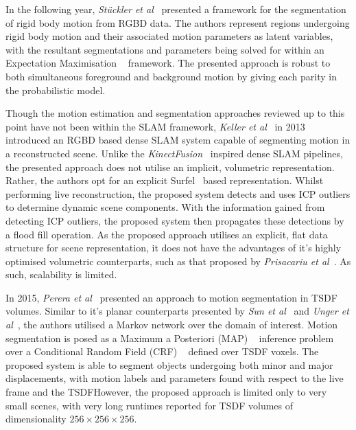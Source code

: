 In the following year, \textit{St{\"u}ckler et al}~\cite{Stueckler2013} presented a framework 
for the segmentation of rigid body motion from RGBD data. The authors represent regions undergoing 
rigid body motion and their associated motion parameters as latent variables, with the resultant 
segmentations and parameters being solved for within an Expectation Maximisation
~\cite{BishopPRML, Murphy2012ML} framework. The presented approach is robust to both simultaneous 
foreground and background motion by giving each parity in the probabilistic model.

Though the motion estimation and segmentation approaches reviewed up to this point have not 
been within the SLAM framework, \textit{Keller et al}~\cite{Keller2013} in 2013 introduced an 
RGBD based dense SLAM system capable of segmenting motion in a reconstructed scene. Unlike the 
\textit{KinectFusion}~\cite{Newcombe2011} inspired dense SLAM pipelines, the presented approach 
does not utilise an implicit, volumetric representation. Rather, the authors opt for an explicit 
Surfel~\cite{Pfister2000} based representation. Whilst performing live reconstruction, the proposed 
system detects and uses ICP outliers to determine dynamic scene components. With the information gained 
from detecting ICP outliers, the proposed system then propagates these detections by a flood fill operation. 
As the proposed approach utilises an explicit, flat data structure for scene representation, it does not 
have the advantages of it's highly optimised volumetric counterparts, such as that proposed by 
\textit{Prisacariu et al}~\cite{Prisacariu2011}. As such, scalability is limited.

In 2015, \textit{Perera et al}~\cite{Perera2015} presented an approach to motion segmentation in 
TSDF volumes. Similar to it's planar counterparts presented by \textit{Sun et al}~\cite{Sun2012} 
and \textit{Unger et al}~\cite{Unger2012}, the authors utilised a Markov network over the domain 
of interest. Motion segmentation is posed as a Maximum a Posteriori (MAP)
~\cite{BishopPRML, Murphy2012ML} inference problem over a Conditional Random Field (CRF)
~\cite{Krahenbuhl2011} defined over TSDF voxels. The proposed system is able to segment objects 
undergoing both minor and major displacements, with motion labels and parameters found with 
respect to the live frame and the TSDF\@ However, the proposed approach is limited only to very 
small scenes, with very long runtimes reported for TSDF volumes of dimensionality 
\( 256 \times 256 \times 256\).

